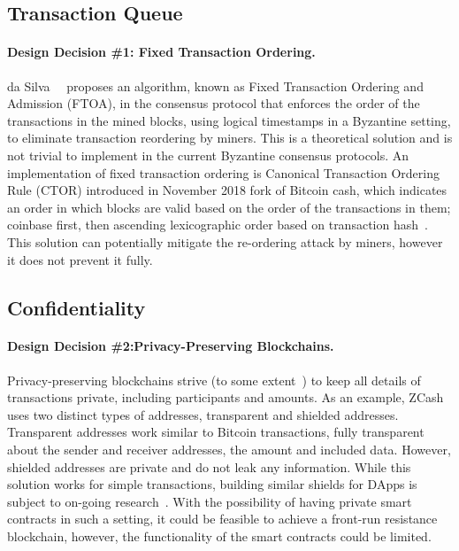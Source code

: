 \subsection{Transaction Queue}


\paragraph{Design Decision \#1: Fixed Transaction Ordering.} da Silva~\etal~\cite{fixedordering2018silva} proposes an algorithm, known as Fixed Transaction Ordering and Admission (FTOA), in the consensus protocol that enforces the order of the transactions in the mined blocks, using logical timestamps in a Byzantine setting, to eliminate transaction reordering by miners. This is a theoretical solution and is not trivial to implement in the current Byzantine consensus protocols. An implementation of fixed transaction ordering is Canonical Transaction Ordering Rule (CTOR) introduced in November 2018 fork of Bitcoin cash, which indicates an order in which blocks are valid based on the order of the transactions in them; coinbase first, then ascending lexicographic order based on transaction hash~\cite{bitcoinABC2018CTOR}. This solution can potentially mitigate the re-ordering attack by miners, however it does not prevent it fully. 



\subsection{Confidentiality}

\paragraph{Design Decision \#2:Privacy-Preserving Blockchains.}
Privacy-preserving blockchains strive (to some extent~\cite{miller2017empirical,kappos2018empirical}) to keep all details of transactions private, including participants and amounts. As an example, ZCash~\cite{hopwood2016zcash} uses two distinct types of addresses, transparent and shielded addresses. Transparent addresses work similar to Bitcoin transactions, fully transparent about the sender and receiver addresses, the amount and included data. However, shielded addresses are private and do not leak any information. While this solution works for simple transactions, building similar shields for DApps is subject to on-going research~\cite{kosba2016hawk}. With the possibility of having private smart contracts in such a setting, it could be feasible to achieve a front-run resistance blockchain, however, the functionality of the smart contracts could be limited. 

